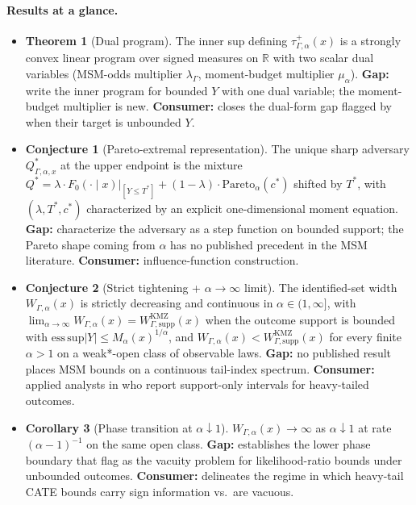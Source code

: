 \documentclass[11pt]{article}
\newcommand{\R}{\mathbb{R}}
\theoremstyle{definition}
\theoremstyle{plain}
\theoremstyle{remark}
\begin{document}
\paragraph{Results at a glance.}
\begin{itemize}[leftmargin=1.4em,itemsep=0pt]
  \item \textbf{Theorem 1} (Dual program). The inner sup defining $\tau^+_{\Gamma,\alpha}(x)$ is a strongly convex linear program over signed measures on $\R$ with two scalar dual variables (MSM-odds multiplier $\lambda_\Gamma$, moment-budget multiplier $\mu_\alpha$). \textbf{Gap:} \cite{KallusMaoZhou2019CATEIntervals,YadlowskyNamkoongBasuDuchiTian2022Bounds} write the inner program for bounded $Y$ with one dual variable; the moment-budget multiplier is new. \textbf{Consumer:} closes the dual-form gap flagged by \cite{DornGuoKallus2025DVDS} when their target is unbounded $Y$.
  \item \textbf{Conjecture 1} (Pareto-extremal representation). The unique sharp adversary $Q^\ast_{\Gamma,\alpha,x}$ at the upper endpoint is the mixture $Q^\ast = \lambda \cdot F_0(\cdot\mid x)|_{[Y\le T^\ast]} + (1-\lambda)\cdot \mathrm{Pareto}_\alpha(c^\ast)$ shifted by $T^\ast$, with $(\lambda, T^\ast, c^\ast)$ characterized by an explicit one-dimensional moment equation. \textbf{Gap:} \cite{KallusMaoZhou2019CATEIntervals} characterize the adversary as a step function on bounded support; the Pareto shape coming from $\alpha$ has no published precedent in the MSM literature. \textbf{Consumer:} \cite{DornGuoKallus2025DVDS} influence-function construction.
  \item \textbf{Conjecture 2} (Strict tightening + $\alpha\to\infty$ limit). The identified-set width $W_{\Gamma,\alpha}(x)$ is strictly decreasing and continuous in $\alpha\in(1,\infty]$, with $\lim_{\alpha\to\infty} W_{\Gamma,\alpha}(x) = W^{\mathrm{KMZ}}_{\Gamma,\mathrm{supp}}(x)$ when the outcome support is bounded with $\mathrm{ess\,sup}|Y|\le M_\alpha(x)^{1/\alpha}$, and $W_{\Gamma,\alpha}(x) < W^{\mathrm{KMZ}}_{\Gamma,\mathrm{supp}}(x)$ for every finite $\alpha>1$ on a weak*-open class of observable laws. \textbf{Gap:} no published result places MSM bounds on a continuous tail-index spectrum. \textbf{Consumer:} applied analysts in \cite{LordanSalehzadehNobari2026TailUncertainty} who report support-only intervals for heavy-tailed outcomes.
  \item \textbf{Corollary 3} (Phase transition at $\alpha\downarrow 1$). $W_{\Gamma,\alpha}(x)\to\infty$ as $\alpha\downarrow 1$ at rate $(\alpha-1)^{-1}$ on the same open class. \textbf{Gap:} establishes the lower phase boundary that \cite{AsiaeePalBeckHuling2026SharpGeneralization} flag as the vacuity problem for likelihood-ratio bounds under unbounded outcomes. \textbf{Consumer:} delineates the regime in which heavy-tail CATE bounds carry sign information vs.\ are vacuous.
\end{itemize}
\end{document}
